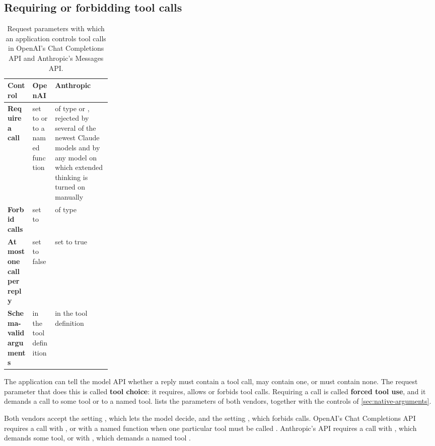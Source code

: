 \subsection{Requiring or forbidding tool calls}
\label{sec:native-choice}

\begin{table}[t]
  \caption{Request parameters with which an application controls tool calls in OpenAI's Chat
  Completions API and Anthropic's Messages API.}
  \label{tab:native-controls}
  \begin{adjustbox}{width=\linewidth}\begin{tabularx}{\linewidth}{L{0.24\linewidth}XX}
    \toprule
    \textbf{Control} & \textbf{OpenAI} & \textbf{Anthropic} \\
    \midrule
    \textbf{Require a call} &  set to  or to a named
    function &  of type  or , rejected by several
    of the newest Claude models and by any model on which extended thinking is turned on manually \\ \addlinespace[3pt]
    \textbf{Forbid calls} &  set to  &
     of type  \\ \addlinespace[3pt]
    \textbf{At most one call per reply} &  set to false
    &  set to true \\ \addlinespace[3pt]
    \textbf{Schema-valid arguments} &  in the tool definition &
     in the tool definition \\
    \bottomrule
  \end{tabularx}\end{adjustbox}
\end{table}

The application can tell the model API whether a reply must contain a tool call, may contain one,
or must contain none. The request parameter that does this is called \textbf{tool choice}: it
requires, allows or forbids tool calls. Requiring a call is called \textbf{forced tool use}, and it
demands a call to some tool or to a named tool.  lists the parameters of
both vendors, together with the controls of \cref{sec:native-arguments}.

Both vendors accept the setting , which lets the model decide, and the setting
, which forbids calls. OpenAI's Chat Completions API requires a call with
, or with a named function when one particular tool must be called
\citep{openai-function-calling}. Anthropic's API requires a call with , which demands
some tool, or with , which demands a named tool \citep{anthropic-define-tools}.

